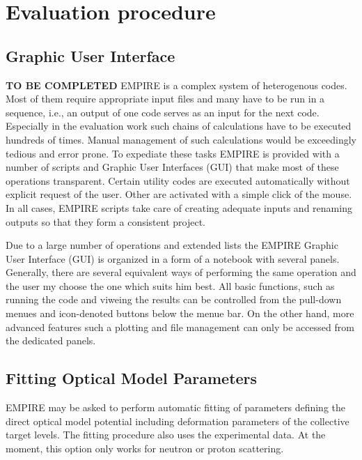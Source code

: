 \documentclass[twocolumn,amsmath,amssymb,10pt,groupedaddress,a4paper]{revtex4}
\begin{document}
\section{Evaluation procedure}

\subsection{Graphic User Interface}

\textbf{TO BE COMPLETED}
EMPIRE is a complex system of heterogenous codes. Most of them require
appropriate input files and many have to be run in a sequence, i.e., an output of one code serves
as an input for the next code. Especially in the evaluation work such chains of
calculations have to be executed hundreds of times. Manual  management of such calculations
would be exceedingly tedious and error prone. To expediate these tasks EMPIRE is provided with a number of scripts and Graphic User Interfaces (GUI) that make most of these operations transparent.
Certain utility codes are executed automatically without explicit request of the user.
Other are activated with a simple click of the mouse. In all cases, EMPIRE scripts take
care of creating adequate inputs and renaming outputs so that they form a consistent project.

Due to a large number of operations and extended lists the EMPIRE Graphic User Interface (GUI)
is organized in a form of a notebook with several panels. Generally,
there are several equivalent ways of performing the same operation
and the user my choose the one which suits him best. All basic functions,
such as running the code and viweing the results can be controlled from
the pull-down menues and icon-denoted buttons below the menue bar.
On the other hand, more advanced features such a plotting and file
management can only be accessed from the dedicated panels.

\subsection{Fitting Optical Model Parameters}
EMPIRE may be asked to perform automatic fitting of parameters defining the direct optical model potential including  deformation parameters of the collective target levels. The fitting procedure also uses the experimental data. At the moment, this option only works for neutron or proton scattering.
\end{document}

